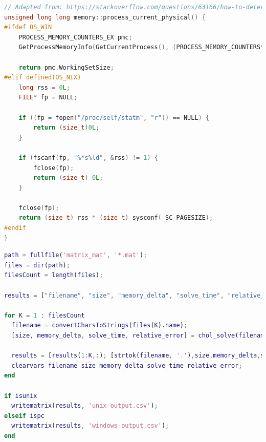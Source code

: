\documentclass[11pt,italian]{article}
\begin{document}
\newpage
\begin{lstlisting}[language=C++,basicstyle=\footnotesize\ttfamily,caption=Lettura della memoria in C++]
// Adapted from: https://stackoverflow.com/questions/63166/how-to-determine-cpu-and-memory-consumption-from-inside-a-process
unsigned long long memory::process_current_physical() {
#ifdef OS_WIN
    PROCESS_MEMORY_COUNTERS_EX pmc;
    GetProcessMemoryInfo(GetCurrentProcess(), (PROCESS_MEMORY_COUNTERS*)&pmc, sizeof(pmc));

    return pmc.WorkingSetSize;
#elif defined(OS_NIX)
    long rss = 0L;
    FILE* fp = NULL;

    if ((fp = fopen("/proc/self/statm", "r")) == NULL) {
        return (size_t)0L;
    }

    if (fscanf(fp, "%*s%ld", &rss) != 1) {
        fclose(fp);
        return (size_t) 0L;
    }

    fclose(fp);
    return (size_t) rss * (size_t) sysconf(_SC_PAGESIZE);
#endif
}
\end{lstlisting}

\newpage
\begin{lstlisting}[language=MatLab,basicstyle=\footnotesize\ttfamily,caption=Main dell'implementazione MATLAB]
path = fullfile('matrix_mat', '*.mat');
files = dir(path);
filesCount = length(files);

results = ["filename", "size", "memory_delta", "solve_time", "relative_error"];

for K = 1 : filesCount
  filename = convertCharsToStrings(files(K).name);
  [size, memory_delta, solve_time, relative_error] = chol_solve(filename, 1);

  results = [results(1:K,:); [strtok(filename, '.'),size,memory_delta,solve_time,relative_error]];
  clearvars filename size memory_delta solve_time relative_error;
end

if isunix
  writematrix(results, 'unix-output.csv');
elseif ispc
  writematrix(results, 'windows-output.csv');
end
\end{lstlisting}
\end{document}

